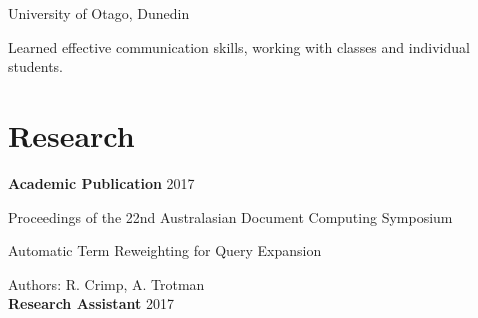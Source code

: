 \documentclass[a4paper, oneside, final]{scrartcl}
\begin{document}
    University of Otago, Dunedin 
    
	Learned effective communication skills, working with classes and individual students.
    
    
    \iffalse
    \section{Teaching Experience}
    \noindent	
    \textbf{Lecturer} --- CompSci Dept, University of Otago \hfill 2017 --- now \\
	Teaching undergraduate classes to 30-50 students. \\
    
    \noindent	
    \textbf{Tutor} --- Disability Information \& Support, University of Otago  \hfill 2015 --- \\
	One on one teaching on subject specific material. Computer Science, Maths, Stats. \\
    
	\noindent	
    \textbf{Demonstrator} --- 	CompSci Dept, University of Otago \hfill 2014 --- \\
	Supervising CS undergrad computer labs, and assisting the students with their work. \\
    \fi
    
    
	\section{Research}
    
    \noindent
    \textbf{Academic Publication} \hfill 2017 \hfill
    
    Proceedings of the 22nd Australasian Document Computing Symposium
    
    Automatic Term Reweighting for Query Expansion
    
    Authors: R. Crimp, A. Trotman \\
    
   	\noindent
    \textbf{Research Assistant} \hfill 2017 \hfill
    
\end{document}
